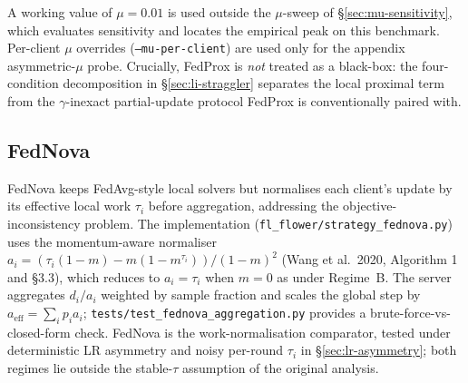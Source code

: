 \documentclass[11pt,a4paper]{report}
\begin{document}
A working value of $\mu = 0.01$ is used outside the $\mu$-sweep of
§\ref{sec:mu-sensitivity}, which evaluates sensitivity and locates the
empirical peak on this benchmark. Per-client $\mu$ overrides
(\texttt{--mu-per-client}) are used only for the appendix
asymmetric-$\mu$ probe. Crucially, FedProx is \emph{not} treated as a
black-box: the four-condition decomposition in §\ref{sec:li-straggler}
separates the local proximal term from the $\gamma$-inexact
partial-update protocol FedProx is conventionally paired with.

\subsection{FedNova}

FedNova \citep{wang2020fednova} keeps FedAvg-style local solvers but
normalises each client's update by its effective local work $\tau_i$
before aggregation, addressing the objective-inconsistency problem.
The implementation (\texttt{fl\_flower/strategy\_fednova.py}) uses the
momentum-aware normaliser $a_i = (\tau_i(1-m) - m(1-m^{\tau_i})) /
(1-m)^{2}$ (Wang et al.\ 2020, Algorithm 1 and §3.3), which reduces to
$a_i = \tau_i$ when $m = 0$ as under Regime~B. The server aggregates
$d_i / a_i$ weighted by sample fraction and scales the global step by
$a_{\textrm{eff}} = \sum_i p_i a_i$;
\texttt{tests/test\_fednova\_aggregation.py} provides a
brute-force-vs-closed-form check. FedNova is the work-normalisation
comparator, tested under deterministic LR asymmetry and noisy per-round
$\tau_i$ in §\ref{sec:lr-asymmetry}; both regimes lie outside the
stable-$\tau$ assumption of the original analysis.
\end{document}
